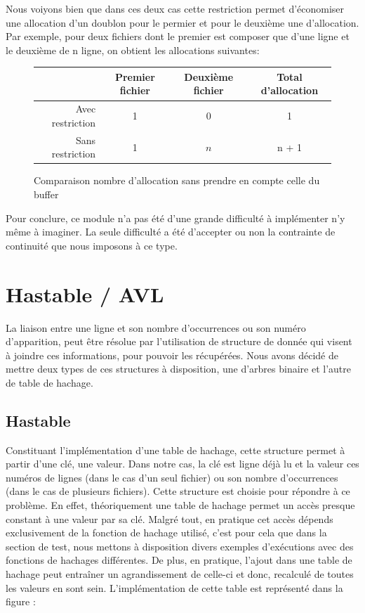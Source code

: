 \documentclass[12pt]{article}
\begin{document}
    Nous voiyons bien que dans ces deux cas cette restriction permet 
    d'économiser une allocation d'un doublon pour le permier et pour le 
    deuxième une d'allocation. Par exemple, pour deux fichiers dont le 
    premier est composer que d'une ligne et le deuxième de n ligne, on 
    obtient les allocations suivantes:\\
    \begin{figure}[ht]
        \centering
        \begin{tabular}{|r|c|c|c|}
            \hline{}
                \cellcolor{gray!25}     & Premier fichier & Deuxième fichier & 
                Total d'allocation \\
            \hline{}
            Avec restriction  & 1 & 0 & 1 \\
            \hline{}
            Sans restriction & 1 & $n$ & n + 1\\
            \hline
        \end{tabular}
        \caption{Comparaison nombre d'allocation sans prendre en compte 
        celle du buffer}\label{tab-compar-da}
    \end{figure}


    Pour conclure, ce module n'a pas été d'une grande difficulté à 
    implémenter n'y même à imaginer. La seule difficulté a été  
    d'accepter ou non la contrainte de continuité que nous imposons à ce type.

    \section{Hastable / AVL}

    La liaison entre une ligne et son nombre d'occurrences ou son numéro 
    d'apparition, peut être résolue par l'utilisation de structure de donnée qui 
    visent à joindre ces informations, pour pouvoir les récupérées. Nous avons 
    décidé de mettre deux types de ces structures à disposition, une d'arbres 
    binaire et l'autre de table de hachage. 

    \subsection{Hastable}

    Constituant l'implémentation d'une table de hachage, cette structure permet 
    à partir d'une clé, une valeur. Dans notre cas, la clé est ligne déjà lu et 
    la valeur ces numéros de lignes (dans le cas d'un seul fichier) ou son 
    nombre d'occurrences (dans le cas de plusieurs fichiers). Cette structure est 
    choisie pour répondre à ce problème. En effet, théoriquement une 
    table de hachage permet un accès presque constant à une valeur par sa clé. 
    Malgré tout, en pratique cet accès dépends exclusivement de la fonction 
    de hachage utilisé, c'est pour cela que dans la section de test, nous mettons 
    à disposition divers exemples d'exécutions avec des fonctions de hachages 
    différentes. De plus, en pratique, l'ajout dans une table de hachage peut
    entraîner un agrandissement de celle-ci et donc, recalculé de toutes les 
    valeurs en sont sein. L'implémentation de cette table est représenté dans 
    la figure : 
    
\end{document}
